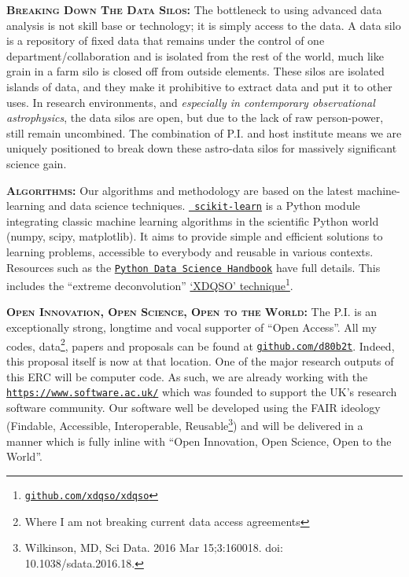 \smallskip
\smallskip
\noindent
\textbf{\textsc{Breaking Down The Data Silos: }}
The bottleneck to using advanced data analysis is not skill base or technology; it is simply access to the data.  A data silo is a repository of fixed data that remains under the control of one department/collaboration and is isolated from the rest of the world, much like grain in a farm silo is closed off from outside elements. These silos are isolated islands of data, and they make it prohibitive to extract data and put it to other uses. %
In research environments, and {\it especially in contemporary observational astrophysics}, the data silos are open, but due to the lack of raw
person-power, still remain uncombined. The combination of P.I. and host institute means we are uniquely positioned to break down these astro-data silos for massively significant science gain. 


\smallskip
\smallskip
\noindent
\textbf{\textsc{Algorithms: }}
Our algorithms and methodology are based on the latest machine-learning and data science techniques. 
\href{http://ogrisel.github.io/scikit-learn.org/sklearn-tutorial/index.html}{\tt
scikit-learn} is a Python module integrating classic machine learning
algorithms in the scientific Python world (numpy, scipy,
matplotlib). It aims to provide simple and efficient solutions to
learning problems, accessible to everybody and reusable in various
contexts.  
Resources such as the 
\href{https://github.com/jakevdp/PythonDataScienceHandbook}{{\tt Python Data Science Handbook}} have full details.
%
This includes the ``extreme deconvolution'' \href{http://www.sdss.org/dr14/data\_access/value-added-catalogs/?vac\_id=xdqso/}{`XDQSO' technique}\footnote{\href{https://github.com/xdqso/xdqso}{\tt github.com/xdqso/xdqso}}.



\smallskip
\smallskip
\noindent
\textbf{\textsc{Open Innovation, Open Science, Open to the World:}} 
The P.I. is an exceptionally strong, longtime and vocal supporter of ``Open Access''. 
All my codes, data\footnote{Where I am not breaking current data access agreements}, papers 
and proposals can be found at \href{github.com/d80b2t}{{\tt github.com/d80b2t}}. 
Indeed, this proposal itself is now at that location. 
One of the major research outputs of this ERC will be computer code.
As such, we are already working with the \href{The Software
Sustainability Institute}{\tt https://www.software.ac.uk/} which was
founded to support the UK's research software community.  Our software
well be developed using the FAIR ideology (Findable, Accessible,
Interoperable, Reusable\footnote{Wilkinson, MD, Sci Data. 2016 Mar
15;3:160018. doi: 10.1038/sdata.2016.18.})  and will be delivered in
a manner which is fully inline with ``Open Innovation, Open Science,
Open to the World''.



